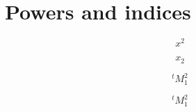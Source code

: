\documentclass{article}
\begin{document}
\section*{Powers and indices}

\[x^2\]

\[x_2\]

\[^tM^{2}_{1}\]

\[^{t\!}M^{2}_{1}\]
\end{document}
